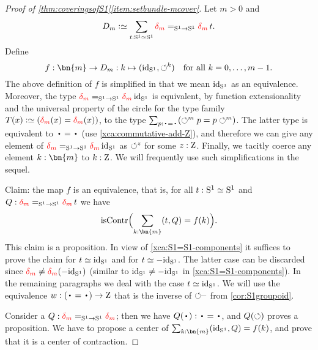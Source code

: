 \begin{proof}[Proof of \cref{thm:coveringsofS1}\ref{item:setbundle-mcover}]
  Let $m>0$ and
  \[
    D_m\defequi\sum_{t:\Sc\equiv\Sc} \dg{m} =_{\Sc\to\Sc} \dg{m} t.
  \]
Define 
\[
f: \bn{m} \to D_m: k \mapsto (\id_\Sc,{\Sloop}^k)\quad\text{for all $k=0,\ldots,m-1$}.
\]
The above definition of $f$ is simplified in that we mean $\mathord{\mathrm{id}}_{\mathrm{S}^1}$
as an equivalence. Moreover, the type $\dg{m} =_{\Sc\to\Sc} \dg{m} \id_\Sc$ is equivalent,
by function extensionality and the universal property of the circle for 
the type family $T(x)\defeq (\dg{m}(x) = \dg{m}(x))$, to the type 
$\sum_{p: \base=\base} (\Sloop^m p = p \Sloop^m)$.
The latter type is equivalent to $\base=\base$ (use \cref{xca:commutative-add-Z}), and therefore
we can give any element of $\dg{m} =_{\Sc\to\Sc} \dg{m} \id_\Sc$ as $\circlearrowleft^z$ for some $z:\mathrm{Z}$.
Finally, we tacitly coerce any element $k:\bn{m}$ to $k:\mathrm{Z}$.
We will frequently use such simplifications in the sequel.

Claim: the map $f$ is an equivalence, that is,
for all $t:{\mathrm{S}^1}\simeq{\mathrm{S}^1}$ and $Q : \dg{m} =_{\Sc\to\Sc} \dg{m} t$ we have
\[
\iscontr\Bigl(\sum_{k:\bn{m}} (t,Q) = f(k)\Bigr).
\]
This claim is a proposition.
In view of \cref{xca:S1=S1-components} it suffices to prove the claim
for $t\jdeq\id_\Sc$ and for $t\jdeq -\id_\Sc$. The latter case can be discarded
since $\dg{m} \neq \dg{m} (-\id_\Sc)$ 
(similar to $\mathord{\mathrm{id}}_{\mathrm{S}^1} \neq -\mathord{\mathrm{id}}_{\mathrm{S}^1}$ in \cref{xca:S1=S1-components}).
In the remaining paragraphs we deal with the case $t\jdeq\id_\Sc$.
We will use the equivalence $w: (\base=\base)\to\zet$ that
is the inverse of ${\circlearrowleft}^{\_}$ from \cref{cor:S1groupoid}.

Consider a $Q: \dg{m} =_{\Sc\to\Sc} \dg{m}$; then we have $Q(\base): \base=\base$,
and $Q(\circlearrowleft)$ proves a proposition. 
We have to propose a center of $\sum_{k:\bn{m}} (\id_\Sc,Q) = f(k)$, 
and prove that it is a center of contraction.


\end{proof}
